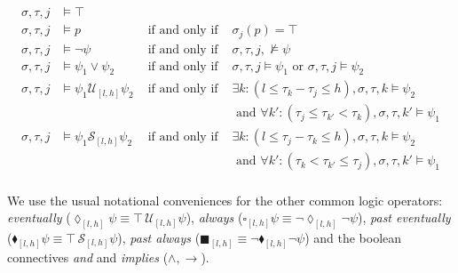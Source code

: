 
\begin{align*}
\sigma, \tau, j &\vDash \top & &\\
\sigma, \tau, j &\vDash p & \text{ if and only if } & \sigma_{j}(p) = \top \\
\sigma, \tau, j &\vDash \neg \psi & \text{ if and only if } & \sigma, \tau, j, \nvDash \psi \\
\sigma, \tau, j &\vDash \psi_1 \vee \psi_2 & \text{ if and only if } & \sigma, \tau, j \vDash \psi_1 \text{ or } \sigma, \tau, j \vDash \psi_2 \\
\sigma, \tau, j &\vDash \psi_1 \mathcal{U}_{[l,h]} \psi_2 & \text{ if and only if } 
	& \exists k: (l \leq \tau_k-\tau_j \leq h), \sigma, \tau, k \vDash \psi_2  \\
	& & & \text{ and } \forall k': (\tau_j \leq \tau_{k'} < \tau_k), \sigma, \tau, k' \vDash \psi_1 \\
\sigma,\tau, j &\vDash \psi_1 \mathcal{S}_{[l,h]} \psi_2 & \text{ if and only if } 
	& \exists k:  (l \leq \tau_j - \tau_k \leq h),  \sigma, \tau, k \vDash \psi_2 \\
	& & & \text{ and } \forall k': (\tau_k < \tau_{k'} \leq \tau_j), \sigma, \tau, k' \vDash \psi_1 \\
\end{align*}



We use the usual notational conveniences for the other common logic operators: \emph{eventually} ($\lozenge_{[l,h]} \psi \equiv \top\, \mathcal{U}_{[l,h]} \psi$), \emph{always} ($\square_{[l,h]} \psi \equiv \neg \lozenge_{[l,h]} \neg \psi$), \emph{past eventually} ($\blacklozenge_{[l,h]} \psi \equiv \top\, \mathcal{S}_{[l,h]} \psi$), \emph{past always} ($\blacksquare_{[l,h]} \equiv \neg \blacklozenge_{[l,h]} \neg \psi$) and the boolean connectives \emph{and} and \emph{implies} ($\wedge, \rightarrow$). 



